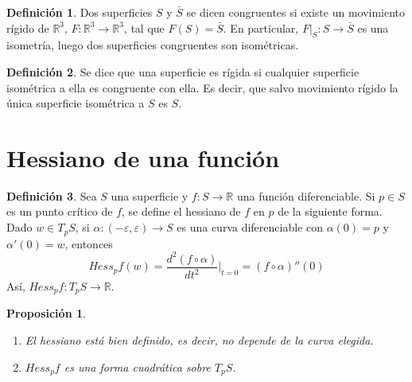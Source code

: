 \documentclass{report}
\newtheorem{proposition}[theorem]{Proposición}
\theoremstyle{remark}
\theoremstyle{remark}
\theoremstyle{definition}
\newtheorem{definition}{Definición}[chapter]
\theoremstyle{definition}
\theoremstyle{definition}
\begin{document}
\begin{definition}
    Dos superficies $S$ y $\bar{S}$ se dicen congruentes si existe un movimiento rígido de $\mathbb{R}^3$, $F : \mathbb{R}^3 \to \mathbb{R}^3$, tal que $F(S) = \bar{S}$.
    En particular, $F|_S : S \to \bar{S}$ es una isometría, luego dos superficies congruentes son isométricas.
\end{definition}

\begin{definition}
    Se dice que una superficie es rígida si cualquier superficie isométrica a ella es congruente con ella. Es decir, que salvo movimiento rígido la única superficie isométrica a $S$ es $S$.
\end{definition}

\section{Hessiano de una función}

\begin{definition}
    Sea $S$ una superficie y $f : S \to \mathbb{R}$ una función diferenciable.
    Si $p \in S$ es un punto crítico de $f$, se define el hessiano de $f$ en $p$ de la siguiente forma.\\
    Dado $w \in T_pS$, si $\alpha : (-\varepsilon, \varepsilon) \to S$ es una curva diferenciable con $\alpha(0) = p$ y $\alpha'(0) = w$, entonces
    $$Hess_pf(w) = \frac{d^2(f \circ \alpha)}{dt^2}|_{t=0} = (f \circ \alpha)''(0)$$
    Así, $Hess_pf : T_pS \to \mathbb{R}$.
\end{definition}

\begin{proposition}
    \hfill
    \begin{enumerate}
        \item El hessiano está bien definido, es decir, no depende de la curva elegida.
        \item $Hess_pf$ es una forma cuadrática sobre $T_pS$.
    \end{enumerate}
\end{proposition}
\end{document}

